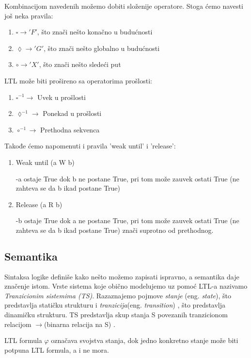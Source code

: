 \documentclass[a4paper]{article}
\begin{document}
{	Kombinacijom navedenih možemo dobiti složenije operatore. Stoga ćemo navesti još neka pravila:
\begin{enumerate}	
\item $\square \rightarrow 'F'$, što znači nešto konačno u budućnosti 
\item $\lozenge \rightarrow 'G'$, što znači nešto globalno u budućnosti 
\item $\circ \rightarrow 'X'$, što znači nešto sledeći put 
\end{enumerate}

	LTL može biti prošireno sa operatorima prošlosti: 
\begin{enumerate}	
\item $\square^{-1} \rightarrow $ Uvek u prošlosti 
\item $\lozenge^{-1} \rightarrow $  Ponekad u prošlosti 
\item $\circ^{-1} \rightarrow $ Prethodna sekvenca 
\end{enumerate}

   Takođe ćemo napomenuti i pravila 'weak until' i 'release':
\begin{enumerate}	
\item  Weak until (a W b)

		-a ostaje True dok b ne postane True, pri tom može zauvek ostati True (ne zahteva se da b ikad postane True)
\item   Release (a R b) 

		-b ostaje True dok a ne postane True, pri tom može zauvek ostati True (ne zahteva se da b ikad postane True) znači suprotno od prethodnog.
\end{enumerate}		

	\subsection{Semantika}
	\label{subsec:podnaslovN}
	
	Sintaksa logike definiše kako nešto možemo zapisati ispravno, a semantika daje značenje istom.
	Vrste sistema koje obično modelujemo uz pomoć LTL-a nazivamo \emph{Tranzicionim sistemima (TS)}. Razaznajemo pojmove \emph{stanje} (eng. \emph{state}), što predstavlja statičku strukturu i \emph{tranzicija}(eng. \emph{transition}) , što predstavlja dinamičku strukturu. TS predstavlja skup stanja S povezanih tranzicionom relacijom $\rightarrow $(binarna relacija na S) \cite{reeves1990logic}.
	
	LTL formula $\varphi$ označava svojstva stanja, dok jedno konkretno stanje može biti potpuna LTL formula, a i ne mora.
	
}
\end{document}
